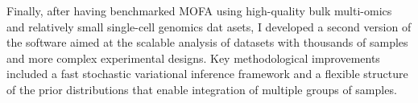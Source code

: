 Finally, after having benchmarked MOFA using high-quality bulk multi-omics and relatively small single-cell genomics dat asets, I developed a second version of the software aimed at the scalable analysis of datasets with thousands of samples and more complex experimental designs. Key methodological improvements included a fast stochastic variational inference framework and a flexible structure of the prior distributions that enable integration of multiple groups of samples. 
